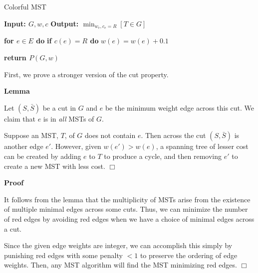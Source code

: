 \documentclass[10pt]{article}
\begin{document}
\begin{solution}

    \begin{algorithm}
        \caption{Colorful MST}
        \begin{algorithmic}[1]
            \Statex \textbf{Input: $G, w, c$}
            \Statex \textbf{Output: $\displaystyle \min_{w_e, c_e=R}{[T \in G]}$}
            
            \State \textbf{for $e \in E$ do}
            \State \qquad \textbf{if $c(e) = R$ do}
            \State \qquad \qquad $w(e) = w(e) + 0.1$

            \State \textbf{return $P(G, w)$}

        \end{algorithmic}
    \end{algorithm}

    First, we prove a stronger version of the cut property.

    \textbf{Lemma}
    
    Let $(S, \bar{S})$ be a cut in $G$ and $e$ be the minimum weight edge across 
    this cut. 
    We claim that $e$ is in \textit{all} MSTs of $G$. 
    
    Suppose an MST, $T$, of $G$ does not contain $e$. 
    Then across the cut $(S, \bar{S})$ is another edge $e'$. 
    However, given $w(e') > w(e)$, a spanning tree of lesser cost can be 
    created by adding $e$ to $T$ to produce a cycle, and then removing $e'$ 
    to create a new MST with less cost. 
    $\Box$
    
    \textbf{Proof}

    It follows from the lemma that the multiplicity of MSTs arise from the existence 
    of multiple minimal edges across some cuts. 
    Thus, we can minimize the number of red edges by avoiding red edges when we 
    have a choice of minimal edges across a cut. 

    Since the given edge weights are integer, we can accomplish this simply by 
    punishing red edges with some penalty $<1$ to preserve the ordering of edge 
    weights. Then, any MST algorithm will find the MST minimizing red edges. 
    $\Box$

\end{solution}

\newpage

\end{document}
